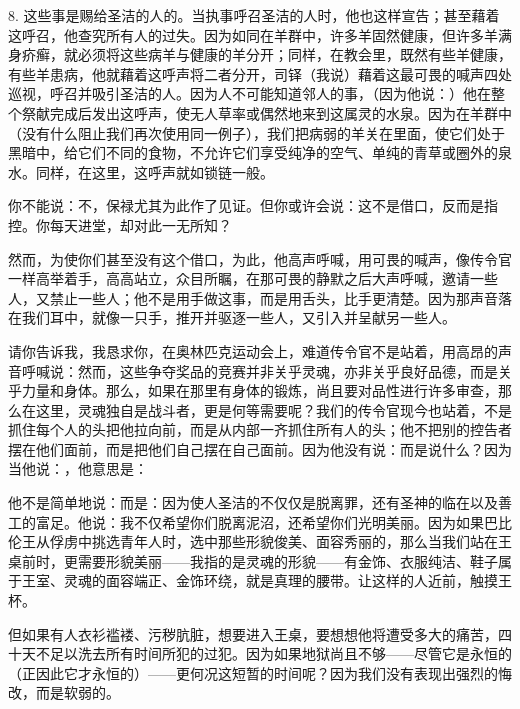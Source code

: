 8. 这些事是赐给圣洁的人的。当执事呼召圣洁的人时，他也这样宣告；甚至藉着这呼召，他查究所有人的过失。因为如同在羊群中，许多羊固然健康，但许多羊满身疥癣，就必须将这些病羊与健康的羊分开；同样，在教会里，既然有些羊健康，有些羊患病，他就藉着这呼声将二者分开，司铎（我说）藉着这最可畏的喊声四处巡视，呼召并吸引圣洁的人。因为人不可能知道邻人的事，（因为他说：）他在整个祭献完成后发出这呼声，使无人草率或偶然地来到这属灵的水泉。因为在羊群中（没有什么阻止我们再次使用同一例子），我们把病弱的羊关在里面，使它们处于黑暗中，给它们不同的食物，不允许它们享受纯净的空气、单纯的青草或圈外的泉水。同样，在这里，这呼声就如锁链一般。\par

你不能说：不，保禄尤其为此作了见证。但你或许会说：这不是借口，反而是指控。你每天进堂，却对此一无所知？\par

然而，为使你们甚至没有这个借口，为此，他高声呼喊，用可畏的喊声，像传令官一样高举着手，高高站立，众目所瞩，在那可畏的静默之后大声呼喊，邀请一些人，又禁止一些人；他不是用手做这事，而是用舌头，比手更清楚。因为那声音落在我们耳中，就像一只手，推开并驱逐一些人，又引入并呈献另一些人。\par

请你告诉我，我恳求你，在奥林匹克运动会上，难道传令官不是站着，用高昂的声音呼喊说：然而，这些争夺奖品的竞赛并非关乎灵魂，亦非关乎良好品德，而是关乎力量和身体。那么，如果在那里有身体的锻炼，尚且要对品性进行许多审查，那么在这里，灵魂独自是战斗者，更是何等需要呢？我们的传令官现今也站着，不是抓住每个人的头把他拉向前，而是从内部一齐抓住所有人的头；他不把别的控告者摆在他们面前，而是把他们自己摆在自己面前。因为他没有说：而是说什么？因为当他说：，他意思是：\par

他不是简单地说：而是：因为使人圣洁的不仅仅是脱离罪，还有圣神的临在以及善工的富足。他说：我不仅希望你们脱离泥沼，还希望你们光明美丽。因为如果巴比伦王从俘虏中挑选青年人时，选中那些形貌俊美、面容秀丽的，那么当我们站在王桌前时，更需要形貌美丽——我指的是灵魂的形貌——有金饰、衣服纯洁、鞋子属于王室、灵魂的面容端正、金饰环绕，就是真理的腰带。让这样的人近前，触摸王杯。\par

但如果有人衣衫褴褛、污秽肮脏，想要进入王桌，要想想他将遭受多大的痛苦，四十天不足以洗去所有时间所犯的过犯。因为如果地狱尚且不够——尽管它是永恒的（正因此它才永恒的）——更何况这短暂的时间呢？因为我们没有表现出强烈的悔改，而是软弱的。\par

